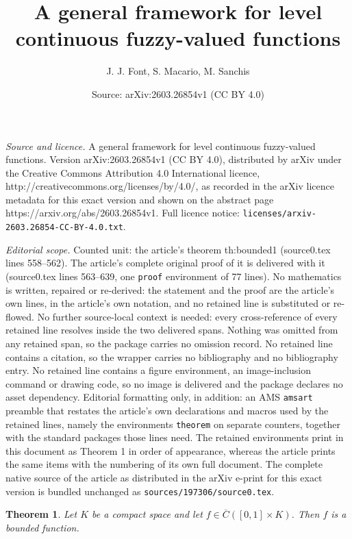\documentclass[10pt,a4paper]{amsart}
\title{A general framework for level continuous fuzzy-valued functions}
\author{J. J. Font, S. Macario, M. Sanchis}
\date{Source: arXiv:2603.26854v1 (CC BY 4.0)}
\newtheorem{theorem}{Theorem}
\begin{document}
\maketitle

\noindent\emph{Source and licence.} A general framework for level continuous fuzzy-valued functions. Version arXiv:2603.26854v1 (CC BY 4.0), distributed by arXiv under the Creative Commons Attribution 4.0 International licence, http://creativecommons.org/licenses/by/4.0/, as recorded in the arXiv licence metadata for this exact version and shown on the abstract page https://arxiv.org/abs/2603.26854v1. Full licence notice: \texttt{licenses/arxiv-2603.26854-CC-BY-4.0.txt}.\par\smallskip

\noindent\textit{Editorial scope.} Counted unit: the article's theorem th:bounded1 (source0.tex lines 558--562). The article's complete original proof of it is delivered with it (source0.tex lines 563--639, one \texttt{proof} environment of 77 lines). No mathematics is written, repaired or re-derived: the statement and the proof are the article's own lines, in the article's own notation, and no retained line is substituted or re-flowed.  No further source-local context is needed: every cross-reference of every retained line resolves inside the two delivered spans.  Nothing was omitted from any retained span, so the package carries no omission record.  No retained line contains a citation, so the wrapper carries no bibliography and no bibliography entry.  No retained line contains a figure environment, an image-inclusion command or drawing code, so no image is delivered and the package declares no asset dependency.  Editorial formatting only, in addition: an AMS \texttt{amsart} preamble that restates the article's own declarations and macros used by the retained lines, namely the environments \texttt{theorem} on separate counters, together with the standard packages those lines need.  The retained environments print in this document as Theorem 1 in order of appearance, whereas the article prints the same items with the numbering of its own full document.  The complete native source of the article as distributed in the arXiv e-print for this exact version is bundled unchanged as \texttt{sources/197306/source0.tex}.
\begin{theorem}\label{th:bounded1}
Let $K$ be a compact space and
let $f\in \overline{C}([0,1]\times K)$.
Then $f$ is a bounded function.
\end{theorem}
\end{document}
